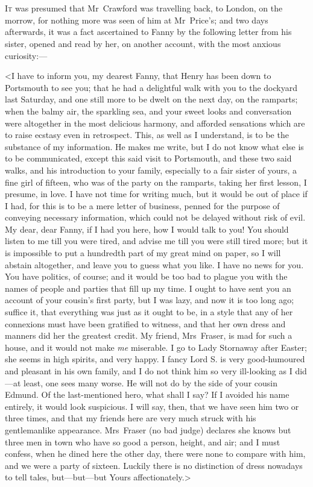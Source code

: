 \chapter[Chapter \thechapter]{} 

\lettrine[lraise=0.3]{I}{t} was presumed that Mr~Crawford was travelling back, to London, on the morrow, for nothing more was seen of him at Mr~Price's; and two days afterwards, it was a fact ascertained to Fanny by the following letter from his sister, opened and read by her, on another account, with the most anxious curiosity:—

<I have to inform you, my dearest Fanny, that Henry has been down to Portsmouth to see you; that he had a delightful walk with you to the dockyard last Saturday, and one still more to be dwelt on the next day, on the ramparts; when the balmy air, the sparkling sea, and your sweet looks and conversation were altogether in the most delicious harmony, and afforded sensations which are to raise ecstasy even in retrospect. This, as well as I understand, is to be the substance of my information. He makes me write, but I do not know what else is to be communicated, except this said visit to Portsmouth, and these two said walks, and his introduction to your family, especially to a fair sister of yours, a fine girl of fifteen, who was of the party on the ramparts, taking her first lesson, I presume, in love. I have not time for writing much, but it would be out of place if I had, for this is to be a mere letter of business, penned for the purpose of conveying necessary information, which could not be delayed without risk of evil. My dear, dear Fanny, if I had you here, how I would talk to you! You should listen to me till you were tired, and advise me till you were still tired more; but it is impossible to put a hundredth part of my great mind on paper, so I will abstain altogether, and leave you to guess what you like. I have no news for you. You have politics, of course; and it would be too bad to plague you with the names of people and parties that fill up my time. I ought to have sent you an account of your cousin's first party, but I was lazy, and now it is too long ago; suffice it, that everything was just as it ought to be, in a style that any of her connexions must have been gratified to witness, and that her own dress and manners did her the greatest credit. My friend, Mrs~Fraser, is mad for such a house, and it would not make \textit{me}  miserable. I go to Lady Stornaway after Easter; she seems in high spirits, and very happy. I fancy Lord S. is very good-humoured and pleasant in his own family, and I do not think him so very ill-looking as I did—at least, one sees many worse. He will not do by the side of your cousin Edmund. Of the last-mentioned hero, what shall I say? If I avoided his name entirely, it would look suspicious. I will say, then, that we have seen him two or three times, and that my friends here are very much struck with his gentlemanlike appearance. Mrs~Fraser (no bad judge) declares she knows but three men in town who have so good a person, height, and air; and I must confess, when he dined here the other day, there were none to compare with him, and we were a party of sixteen. Luckily there is no distinction of dress nowadays to tell tales, but—but—but Yours affectionately.>

